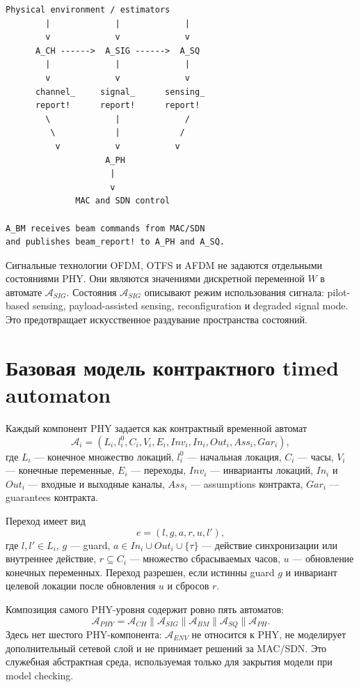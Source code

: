 \documentclass[10pt,a4paper]{article}
\newcommand{\A}[1]{\mathcal{A}_{#1}}
\begin{document}
\begin{verbatim}
Physical environment / estimators
        |             |             |
        v             v             v
      A_CH ------>  A_SIG ------>  A_SQ
        |             |             |
        v             v             v
      channel_     signal_      sensing_
      report!      report!      report!
        \             |             /
         \            |            /
          v           v           v
                    A_PH
                     |
                     v
              MAC and SDN control

A_BM receives beam commands from MAC/SDN
and publishes beam_report! to A_PH and A_SQ.
\end{verbatim}

Сигнальные технологии OFDM, OTFS и AFDM не задаются отдельными состояниями PHY. Они являются значениями дискретной переменной \(W\) в автомате \(\A{SIG}\). Состояния \(\A{SIG}\) описывают режим использования сигнала: pilot-based sensing, payload-assisted sensing, reconfiguration и degraded signal mode. Это предотвращает искусственное раздувание пространства состояний.

\section{Базовая модель контрактного timed automaton}

Каждый компонент PHY задается как контрактный временной автомат
\begin{equation}
\A{i}=(L_i,l_i^0,C_i,V_i,E_i,Inv_i,In_i,Out_i,Ass_i,Gar_i),
\end{equation}
где \(L_i\) --- конечное множество локаций, \(l_i^0\) --- начальная локация, \(C_i\) --- часы, \(V_i\) --- конечные переменные, \(E_i\) --- переходы, \(Inv_i\) --- инварианты локаций, \(In_i\) и \(Out_i\) --- входные и выходные каналы, \(Ass_i\) --- assumptions контракта, \(Gar_i\) --- guarantees контракта.

Переход имеет вид
\begin{equation}
e=(l,g,a,r,u,l'),
\end{equation}
где \(l,l'\in L_i\), \(g\) --- guard, \(a\in In_i\cup Out_i\cup\{\tau\}\) --- действие синхронизации или внутреннее действие, \(r\subseteq C_i\) --- множество сбрасываемых часов, \(u\) --- обновление конечных переменных. Переход разрешен, если истинны guard \(g\) и инвариант целевой локации после обновления \(u\) и сбросов \(r\).

Композиция самого PHY-уровня содержит ровно пять автоматов:
\begin{equation}
\A{PHY}=\A{CH}\parallel\A{SIG}\parallel\A{BM}\parallel\A{SQ}\parallel\A{PH}.
\end{equation}
Здесь нет шестого PHY-компонента: \(\A{ENV}\) не относится к PHY, не моделирует дополнительный сетевой слой и не принимает решений за MAC/SDN. Это служебная абстрактная среда, используемая только для закрытия модели при model checking.
\end{document}
